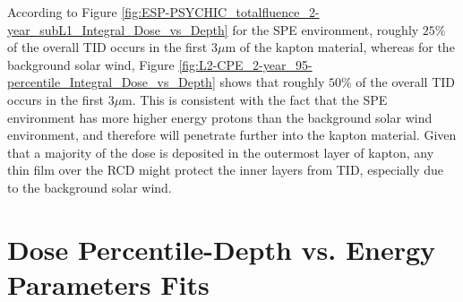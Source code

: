 \documentclass{hitec}
\begin{document}
According to Figure \ref{fig:ESP-PSYCHIC_totalfluence_2-year_subL1_Integral_Dose_vs_Depth} for the SPE environment, roughly $25\%$ of the overall TID occurs in the first $3\mu$m of the kapton material, whereas for the background solar wind, Figure \ref{fig:L2-CPE_2-year_95-percentile_Integral_Dose_vs_Depth} shows that roughly $50\%$ of the overall TID occurs in the first $3\mu$m. This is consistent with the fact that the SPE environment has more higher energy protons than the background solar wind environment, and therefore will penetrate further into the kapton material. Given that a majority of the dose is deposited in the outermost layer of kapton, any thin film over the RCD might protect the inner layers from TID, especially due to the background solar wind. 
\newpage
\appendix

\section{Dose Percentile-Depth vs. Energy Parameters Fits}
\label{App:Dose Percentile-Depth vs. Energy Parameters Fits}
\end{document}
